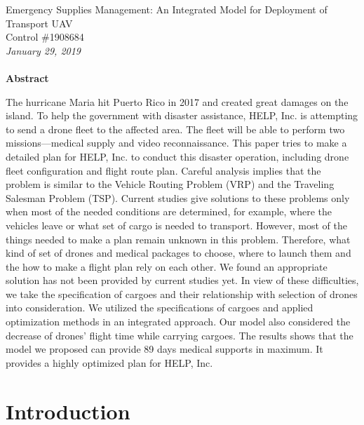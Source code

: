 \documentclass[12pt]{article}
\begin{document}
	
	\begin{titlepage}
		\begin{center}
			\Large{Emergency Supplies Management: An Integrated Model for Deployment of Transport UAV}\\
			\Large{Control \#1908684}\\
			\textit{January 29, 2019}\\
			~\\
			\textbf{Abstract} 
		\end{center}
		The hurricane Maria hit Puerto Rico in 2017 and created great damages on the island. To help the government with disaster assistance, HELP, Inc. is attempting to send a drone fleet to the affected area. The fleet will be able to perform two missions—medical supply and video reconnaissance. This paper tries to make a detailed plan for HELP, Inc. to conduct this disaster operation, including drone fleet configuration and flight route plan. Careful analysis implies that the problem is similar to the Vehicle Routing Problem (VRP) and the Traveling Salesman Problem (TSP). Current studies give solutions to these problems only when most of the needed conditions are determined, for example, where the vehicles leave or what set of cargo is needed to transport. However, most of the things needed to make a plan remain unknown in this problem. Therefore, what kind of set of drones and medical packages to choose, where to launch them and the how to make a flight plan rely on each other. We found an appropriate solution has not been provided by current studies yet. In view of these difficulties, we take the specification of cargoes and their relationship with selection of drones into consideration. We utilized the specifications of cargoes and applied optimization methods in an integrated approach. Our model also considered the decrease of drones' flight time while carrying cargoes. The results shows that the model we proposed can provide 89 days medical supports in maximum. It provides a highly optimized plan for HELP, Inc.
	\end{titlepage}
	
	\tableofcontents
	\newpage
	
	\section{Introduction}
	
\end{document}
